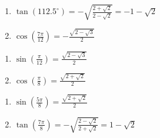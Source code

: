 \documentclass{ximera}
\begin{document}
\begin{multicols}{2}

\begin{enumerate}

\setcounter{enumi}{\value{HW}}

\item $\tan(112.5^{\circ}) = - \sqrt{\frac{2+\sqrt{2}}{2-\sqrt{2}}} = -1 - \sqrt{2}$
\item $\cos\left( \frac{7\pi}{12} \right) = -\frac{\sqrt{2-\sqrt{3}}}{2}$  

\setcounter{HW}{\value{enumi}}

\end{enumerate}

\end{multicols}

\begin{multicols}{2}

\begin{enumerate}

\setcounter{enumi}{\value{HW}}

\item $\sin\left( \frac{\pi}{12} \right) = \frac{\sqrt{2-\sqrt{3}}}{2}$ 
\item $\cos \left( \frac{\pi}{8} \right) = \frac{\sqrt{2 + \sqrt{2}}}{2}$

\setcounter{HW}{\value{enumi}}

\end{enumerate}

\end{multicols}

\begin{multicols}{2}

\begin{enumerate}

\setcounter{enumi}{\value{HW}}

\item $\sin \left( \frac{5\pi}{8} \right) = \frac{\sqrt{2 + \sqrt{2}}}{2}$
\item $\tan \left( \frac{7\pi}{8} \right) = -\sqrt{ \frac{2 - \sqrt{2}}{2 + \sqrt{2}} } =1-\sqrt{2}$

\setcounter{HW}{\value{enumi}}

\end{enumerate}

\end{multicols}
\end{document}
